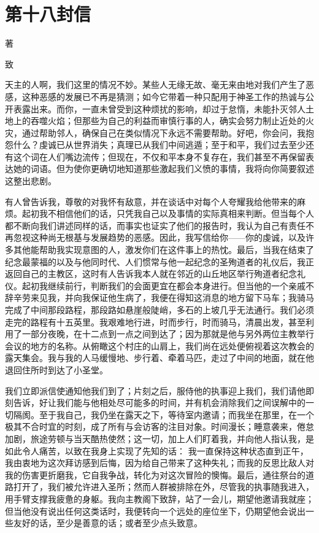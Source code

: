 
\section{第十八封信}

著\par

致\par

天主的人啊，我们这里的情况不妙。某些人无缘无故、毫无来由地对我们产生了恶感，这种恶感的发展已不再是猜测；如今它带着一种只配用于神圣工作的热诚与公开表露出来。而你，一直未曾受到这种烦扰的影响，却过于怠惰，未能扑灭邻人土地上的吞噬火焰；但那些为自己的利益而审慎行事的人，确实会努力制止近处的火灾，通过帮助邻人，确保自己在类似情况下永远不需要帮助。好吧，你会问，我抱怨什么？虔诚已从世界消失；真理已从我们中间逃遁；至于和平，我们过去至少还有这个词在人们嘴边流传；但现在，不仅和平本身不复存在，我们甚至不再保留表达她的词语。但为使你更确切地知道那些激起我们义愤的事情，我将向你简要叙述这整出悲剧。\par

有人曾告诉我，尊敬的对我怀有敌意，并在谈话中对每个人夸耀我给他带来的麻烦。起初我不相信他们的话，只凭我自己以及事情的实际真相来判断。但当每个人都不断向我们讲述同样的话，而事实也证实了他们的报告时，我认为自己有责任不再忽视这种尚无根基与发展趋势的恶感。因此，我写信给你——你的虔诚，以及许多其他能帮助我实现意图的人，激发你们在这件事上的热忱。最后，当我在结束了纪念最蒙福的以及与他同时代、人们惯常与他一起纪念的圣殉道者的礼仪后，我正返回自己的主教区，这时有人告诉我本人就在邻近的山丘地区举行殉道者纪念礼仪。起初我继续前行，判断我们的会面更宜在都会本身进行。但当他的一个亲戚不辞辛劳来见我，并向我保证他生病了，我便在得知这消息的地方留下马车；我骑马完成了中间那段路程，那段路如悬崖般陡峭，多石的上坡几乎无法通行。我们必须走完的路程有十五英里。我艰难地行进，时而步行，时而骑马，清晨出发，甚至利用了一部分夜晚，在十二点到一点之间到达了；因为那就是他与另外两位主教举行会议的地方的名称。从俯瞰这个村庄的山肩上，我们尚在远处便俯视着这次教会的露天集会。我与我的人马缓慢地、步行着、牵着马匹，走过了中间的地面，就在他退回住所时到达了小圣堂。\par

我们立即派信使通知他我们到了；片刻之后，服侍他的执事迎上我们，我们请他即刻告诉，好让我们能与他相处尽可能多的时间，并有机会消除我们之间误解中的一切隔阂。至于我自己，我仍坐在露天之下，等待室内邀请；而我坐在那里，在一个极其不合时宜的时刻，成了所有与会访客的注目对象。时间漫长；睡意袭来，倦怠加剧，旅途劳顿与当天酷热使然；这一切，加上人们盯着我，并向他人指认我，是如此令人痛苦，以致在我身上实现了先知的话： 我一直保持这种状态直到正午，我由衷地为这次拜访感到后悔，因为给自己带来了这种失礼；而我的反思比敌人对我的伤害更折磨我，它自我争战，转化为对这次冒险的懊悔。最后，通往祭台的道路打开了，我们被允许进入圣所；然而人群被排除在外，尽管我的执事随我进入，用手臂支撑我疲惫的身躯。我向主教阁下致辞，站了一会儿，期望他邀请我就座；但当他没有说出任何这类话时，我便转向一个远处的座位坐下，仍期望他会说出一些友好的话，至少是善意的话；或者至少点头致意。\par

